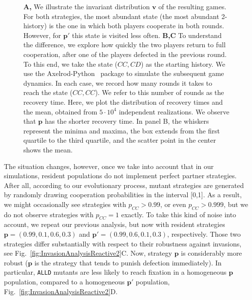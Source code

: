 \documentclass[9pt,twoside,lineno]{pnas-new}
\theoremstyle{plainCl1}
\theoremstyle{plainCl2}
\def\alld{\texttt{ALLD}}
\begin{document}
\begin{figure}[tbhp]
{  \textbf{A,} We illustrate the invariant distribution $\mathbf{v}$ of the resulting games. 
  For both strategies, the most abundant state (the most abundant 2-history) is the one in which both players cooperate in both rounds. 
  However, for $\mathbf{p'}$ this state is visited less often. 
  \textbf{B,C} To understand the difference, we explore how quickly the two players return to full cooperation, after one of the players defected in the previous round. 
  To this end, we take the state ($CC,CD$) as the starting history. 
  We use the Axelrod-Python~\cite{AxelrodPython}
  package to simulate the subsequent game dynamics. 
  In each case, we record how many rounds it takes to reach the state ($CC,CC$). 
  We refer to this number of rounds as the recovery time. 
  Here, we plot the distribution of recovery times and the mean, obtained from $5\!\cdot\!10^4$ independent realizations. 
  We observe that $\mathbf{p}$ has the shorter recovery time.
  In panel B, the whiskers represent the minima and maxima, the box extends from the first quartile to the third quartile, and the scatter point in the center shows the mean. }\label{fig:ReactiveTwoPayoffs}
\end{figure}

The situation changes, however, once we take into account that in our simulations, resident populations do not implement perfect partner strategies. 
After all, according to our evolutionary process, mutant strategies are generated by randomly drawing cooperation probabilities in the interval [0,1]. 
As a result, we might occasionally see strategies with $p_{CC}\!>\!0.99$, or even $p_{CC}\!>\!0.999$, but we do not observe strategies with $p_{CC}\!=\!1$ exactly. 
To take this kind of noise into account, we repeat our previous analysis, but now with resident strategies $\mathbf{p}\!=\!(0.99,0.1,0.6,0.3)$ and $\mathbf{p'}\!=\!(0.99,0.6,0.1,0.3)$, respectively. 
Those two strategies differ substantially with respect to their robustness against invasions, see Fig.~\ref{fig:InvasionAnalysisReactive2}C.
Now, strategy $\mathbf{p}$  is considerably more robust ($\mathbf{p}$ is the strategy that tends to punish defection immediately). 
In particular, \alld{} mutants are less likely to reach fixation in a homogeneous $\mathbf{p}$ population, compared to a homogeneous $\mathbf{p'}$ population, Fig.~\ref{fig:InvasionAnalysisReactive2}D.
\end{document}
